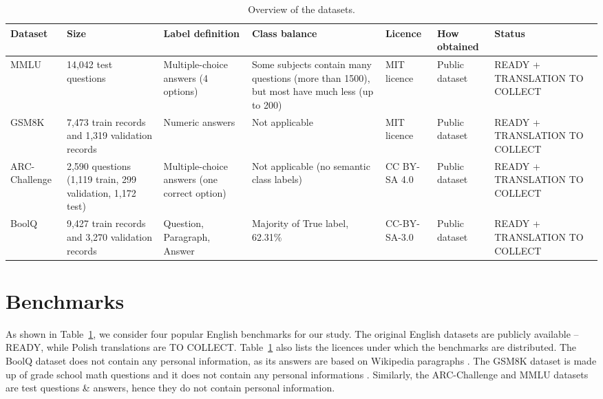 \documentclass[11pt]{article}
\begin{document}
\begin{table}[t]
\centering
\small
\setlength{\tabcolsep}{4pt}
\renewcommand{\arraystretch}{1.25}
\begin{tabular}{p{1.2cm} p{2.5cm} p{2.5cm} p{1.9cm} p{1.7cm} p{2cm} p{2.2cm}}
\hline
\textbf{Dataset} &
\textbf{Size} &
\textbf{Label definition} &
\textbf{Class balance} &
\textbf{Licence} &
\textbf{How obtained} &
\textbf{Status} \\
\hline

MMLU
& 14,042 test questions
& Multiple-choice answers (4 options)
& Some subjects contain many questions (more than 1500), but most have much less (up to 200)
& MIT licence
& Public dataset
& READY + TRANSLATION TO COLLECT \\

GSM8K
& 7,473 train records and 1,319 validation records
& Numeric answers
& Not applicable
& MIT licence
& Public dataset
& READY + TRANSLATION TO COLLECT \\


ARC-Challenge
& 2,590 questions (1,119 train, 299 validation, 1,172 test)
& Multiple-choice answers (one correct option)
& Not applicable (no semantic class labels)
& CC BY-SA 4.0
& Public dataset
& READY + TRANSLATION TO COLLECT \\


BoolQ
& 9,427 train records and 3,270 validation records
& Question, Paragraph, Answer
& Majority of True label, 62.31\%
& CC-BY-SA-3.0
& Public dataset
& READY + TRANSLATION TO COLLECT \\

\hline
\end{tabular}
\caption{Overview of the datasets.}
\label{tab:datasets}
\end{table}
\section{Benchmarks}
As shown in Table~\ref{tab:datasets}, we consider four popular English benchmarks for our study. The original English datasets are publicly available -- READY, while Polish translations are TO COLLECT. Table~\ref{tab:datasets} also lists the licences under which the benchmarks are distributed. The BoolQ dataset does not contain any personal information, as its answers are based on Wikipedia paragraphs \cite{clark2019boolqexploringsurprisingdifficulty}. The GSM8K dataset is made up of grade school math questions and it does not contain any personal informations \cite{DBLP:journals/corr/abs-2110-14168}. Similarly, the ARC-Challenge and MMLU datasets are test questions \& answers, hence they do not contain personal information.
\end{document}
